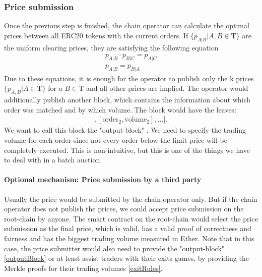 \documentclass[11pt,parskip=full]{scrartcl}%
\newcommand{\Tau}{\mathrm{T}}
\begin{document}
\subsubsection{Price submission}
Once the previous step is finished, the chain operator can calculate the optimal prices between all ERC20 tokens with the current orders. If $\{p_{A|B}| A,B \in \Tau \}$  are the uniform clearing prices, they are satisfying the following equation
\begin{align}
    \label{eq:arbitrage_freeness}
  p_{A|B} \cdot p_{B|C} = p_{A|C}\\
  p_{A|B} = p_{B|A}
\end{align}
Due to these equations, it is enough for the operator to publish only the k prices $\{p_{A,B}| A \in \Tau \}$ for a $B\in \Tau$ and all other prices are implied. \newline
The operator would additionally publish another block, which contains the information about which order was matched and by which volume. The block would have the leaves:
\begin{align}
	[[\text{order}_1, \text{volume}_1], [\text{order}_2, \text{volume}_2],...].
\end{align} 
We want to call this block the "output-block" \label{outputBlock}. 
We need to specify the trading volume for each order since not every order below the limit price will be completely executed. This is non-intuitive, but this is one of the things we have to deal with in a batch auction.

\paragraph{Optional mechanism: Price submission by a third party} Usually the price would be submitted by the chain operator only. But if the chain operator does not publish the prices, we could accept price submission on the root-chain by anyone. The smart contract on the root-chain would select the price submission as the final price, which is valid, has a valid proof of correctness and fairness and has the biggest trading volume measured in Ether. \newline
Note that in this case, the price submitter would also need to provide the "output-block" \ref{outputBlock} or at least assist traders with their exits games, by providing the Merkle proofs for their trading volumes \ref{exitRules}.
\end{document}
